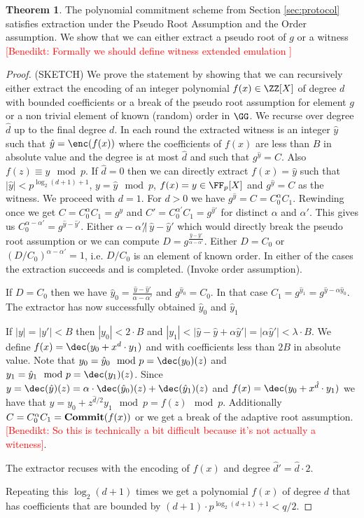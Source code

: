 \documentclass{article}
\theoremstyle{definition}
\newtheorem{theorem}{Theorem}
\newcommand{\benedikt}[1]{{\textcolor{red}{[Benedikt: #1]}}}
\newcommand{\benedikt}[1]{}
\begin{document}
\begin{theorem}
	The polynomial commitment scheme from Section \ref{sec:protocol} satisfies extraction under the Pseudo Root Assumption and the Order assumption. We show that we can either extract a pseudo root of $g$ or a witness \benedikt{Formally we should define witness extended emulation }
\end{theorem}
\begin{proof}
(SKETCH)
We prove the statement by showing that we can recursively either extract the encoding of an integer polynomial $f(x) \in \ZZ[X]$ of degree $d$ with bounded coefficients or a break of the pseudo root assumption for element $g$ or a non trivial element of known (random) order in $\GG$. We recurse over degree $\hat{d}$ up to the final degree $d$.
In each round the extracted witness is an integer $\hat{y}$ such that $\hat{y}=\enc(f(x))$ where the coefficients of $f(x)$ are less than $B$ in absolute value and the degree is at most $\hat{d}$ and such that $g^{\hat{y}}=C$. Also $f(z) \equiv y \mod p$.
If $\hat{d}=0$ then we can directly extract $f(x)=\hat{y}$ such that $\vert \hat{y} \vert < p^{\log_2(d+1)+1}$, $y=\hat{y}\mod p$, $f(x)=y\in \FF_p[X]$ and $g^{\hat{y}}=C$ as the witness. We proceed with $d=1$.
For $d>0$ we have $g^{\hat{y}}=C=C_0^{\alpha}C_1$. Rewinding once we get 
 $C=C_0^{\alpha}C_1=g^{\hat{y}}$ and $C'=C_0^{\alpha'}C_1=g^{\hat{y}'}$ for distinct $\alpha$ and $\alpha'$. 
 This gives us $C_0^{\alpha-\alpha'}=g^{\hat{y}-\hat{y}'}$. 
 Either $\alpha-\alpha' \not|~ \hat{y}-\hat{y}' $ which would directly break the pseudo root assumption or we can compute $D=g^{\frac{\hat{y}-\hat{y}'}{\alpha-\alpha'}}$. Either $D=C_0$ or $(D/C_0)^{\alpha-\alpha'}=1$, i.e. $D/C_0$ is an element of known order. In either of the cases the extraction succeeds and is completed. (Invoke order assumption).
 
 If $D=C_0$ then we have $\hat{y}_0=\frac{\hat{y}-\hat{y}'}{\alpha-\alpha'}$ and
 $g^{\hat{y}_0}=C_0$. In that case $C_1=g^{\hat{y}_1}=g^{\hat{y}-\alpha\hat{y}_0}$. The extractor has now successfully obtained $\hat{y}_0$ and $\hat{y}_1$
 
 If $|y|=|y'|<B$ then $|y_0|<  2 \cdot B$ and $|y_1|<|\hat{y}-\hat{y}+\alpha\hat{y}'|=|\alpha \hat{y}'|<\lambda \cdot B$. 
 We define $f(x)=\dec(y_0+x^{d} \cdot y_1)$ and with coefficients less than $2B$ in absolute value. 
 Note that $y_0=\hat{y}_0 \mod p=\dec(y_0)(z)$ and $y_1=\hat{y}_1 \mod p=\dec(y_1)(z)$. Since $y=\dec(\hat{y})(z)=\alpha \cdot \dec(\hat{y}_0)(z)+\dec(\hat{y}_1)(z)$ and $f(x)=\dec(y_0+x^{\hat{d}} \cdot y_1)$ we have that $y=y_0 +z^{\hat{d}/2}y_1 \mod p=f(z) \mod p$.
 Additionally $C=C_0^{\alpha}C_1=\textbf{{Commit}}(f(x))$ or we get a break of the adaptive root assumption.\benedikt{So this is technically a bit difficult because it's not actually a witeness}.
 
 The extractor recuses with the encoding of $f(x)$ and degree $\hat{d}'=\hat{d}\cdot 2$.
 
 Repeating this $\log_2(d+1)$ times we get a polynomial $f(x)$ of degree $d$ that has coefficients that are bounded by $(d+1) \cdot p^{\log_2(d+1)+1} <q/2$. 
 


\end{proof}
\end{document}
